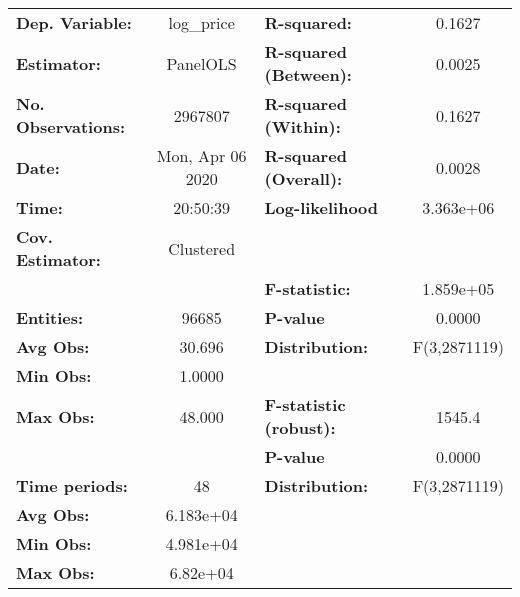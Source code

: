 \documentclass{report}
\begin{document}
\begin{center}
\begin{tabular}{lclc}
\toprule
\textbf{Dep. Variable:}      &     log\_price     & \textbf{  R-squared:         }   &      0.1627      \\
\textbf{Estimator:}          &      PanelOLS      & \textbf{  R-squared (Between):}  &      0.0025      \\
\textbf{No. Observations:}   &      2967807       & \textbf{  R-squared (Within):}   &      0.1627      \\
\textbf{Date:}               &  Mon, Apr 06 2020  & \textbf{  R-squared (Overall):}  &      0.0028      \\
\textbf{Time:}               &      20:50:39      & \textbf{  Log-likelihood     }   &    3.363e+06     \\
\textbf{Cov. Estimator:}     &     Clustered      & \textbf{                     }   &                  \\
\textbf{}                    &                    & \textbf{  F-statistic:       }   &    1.859e+05     \\
\textbf{Entities:}           &       96685        & \textbf{  P-value            }   &      0.0000      \\
\textbf{Avg Obs:}            &       30.696       & \textbf{  Distribution:      }   &   F(3,2871119)   \\
\textbf{Min Obs:}            &       1.0000       & \textbf{                     }   &                  \\
\textbf{Max Obs:}            &       48.000       & \textbf{  F-statistic (robust):} &      1545.4      \\
\textbf{}                    &                    & \textbf{  P-value            }   &      0.0000      \\
\textbf{Time periods:}       &         48         & \textbf{  Distribution:      }   &   F(3,2871119)   \\
\textbf{Avg Obs:}            &     6.183e+04      & \textbf{                     }   &                  \\
\textbf{Min Obs:}            &     4.981e+04      & \textbf{                     }   &                  \\
\textbf{Max Obs:}            &      6.82e+04      & \textbf{                     }   &                  \\
\bottomrule
\end{tabular}
\begin{tabular}{lcccccc}

\end{tabular}
\end{center}
\end{document}
